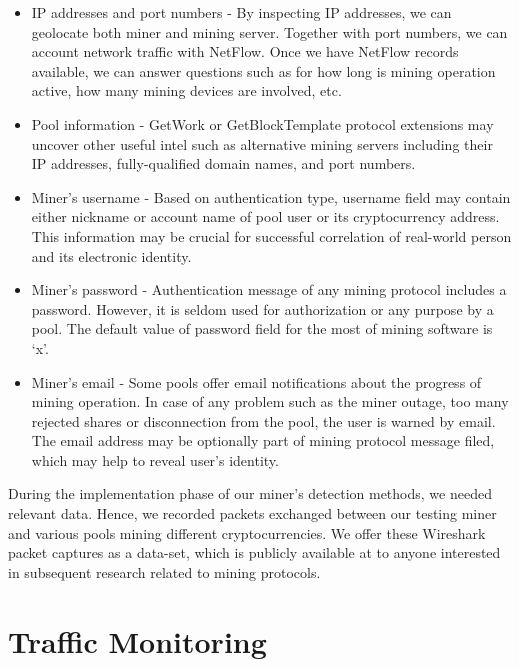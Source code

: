\documentclass[preprint,12pt,3p]{elsarticle}
\begin{document}
\begin{itemize}
    \item IP addresses and port numbers - By inspecting IP addresses, we can geolocate both miner and mining server. Together with port numbers, we can account network traffic with NetFlow. Once we have NetFlow records available, we can answer questions such as for how long is mining operation active, how many mining devices are involved, etc.
    \item Pool information - GetWork or GetBlockTemplate protocol extensions may uncover other useful intel such as alternative mining servers including their IP addresses, fully-qualified domain names, and port numbers.
    \item Miner's username - Based on authentication type, username field may contain either nickname or account name of pool user or its cryptocurrency address. This information may be crucial for successful correlation of real-world person and its electronic identity.
    \item Miner's password - Authentication message of any mining protocol includes a password. However, it is seldom used for authorization or any purpose by a pool. The default value of password field for the most of mining software is `x'.
    \item Miner's email - Some pools offer email notifications about the progress of mining operation. In case of any problem such as the miner outage, too many rejected shares or disconnection from the pool, the user is warned by email. The email address may be optionally part of mining protocol message filed, which may help to reveal user's identity.
\end{itemize}

During the implementation phase of our miner's detection methods, we needed relevant data. Hence, we recorded packets exchanged between our testing miner and various pools mining different cryptocurrencies. We offer these Wireshark packet captures as a data-set, which is publicly available at \cite{GITHUB-REPRO} to anyone interested in subsequent research related to mining protocols.


\section{Traffic Monitoring}
\label{sec4}
\end{document}
